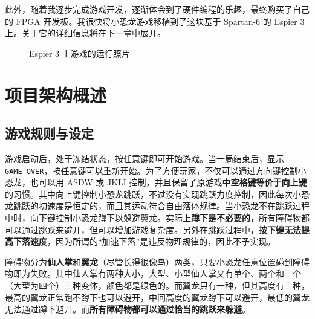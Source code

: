 \documentclass[hyperref,UTF8,12pt,a4paper]{ctexart}
\begin{document}
此外，随着我逐步完成游戏开发，逐渐体会到了硬件编程的乐趣，最终购买了自己的
FPGA 开发板。我很快将小恐龙游戏移植到了这块基于 Spartan-6 的 Espier 3
上。关于它的详细信息将在下一章中展开。

\begin{figure}[H]
\centering
{}
\caption{Espier 3 上游戏的运行照片}
\end{figure}

\hypertarget{ux9879ux76eeux67b6ux6784ux6982ux8ff0}{%
\section{项目架构概述}\label{ux9879ux76eeux67b6ux6784ux6982ux8ff0}}

\hypertarget{ux6e38ux620fux89c4ux5219ux4e0eux8bbeux5b9a}{%
\subsection{游戏规则与设定}\label{ux6e38ux620fux89c4ux5219ux4e0eux8bbeux5b9a}}

游戏启动后，处于冻结状态，按任意键即可开始游戏。当一局结束后，显示\texttt{GAME\ OVER}，按任意键可以重新开始。为了方便玩家，不仅可以通过方向键控制小恐龙，也可以用
ASDW 或 JKLI
控制，并且保留了原游戏中\textbf{空格键等价于向上键}的习惯。其中向上键控制小恐龙跳跃，不过没有实现跳跃力度控制，因此每次小恐龙跳跃的初速度是恒定的，而且其运动符合自由落体规律。当小恐龙不在跳跃过程中时，向下键控制小恐龙蹲下以躲避翼龙。实际上\textbf{蹲下是不必要的}，所有障碍物都可以通过跳跃来避开，但可以增加游戏复杂度。另外在跳跃过程中，\textbf{按下键无法提高下落速度}，因为所谓的``加速下落''是违反物理规律的，因此不予实现。

障碍物分为\textbf{仙人掌}和\textbf{翼龙}（尽管长得很像鸟）两类，只要小恐龙任意位置碰到障碍物即为失败。其中仙人掌有两种大小，大型、小型仙人掌又有单个、两个和三个（大型为四个）三种变体，颜色都是绿色的。而翼龙只有一种，但其高度有三种，最高的翼龙正常跑不蹲下也可以避开，中间高度的翼龙蹲下可以避开，最低的翼龙无法通过蹲下避开。而\textbf{所有障碍物都可以通过恰当的跳跃来躲避}。
\end{document}
